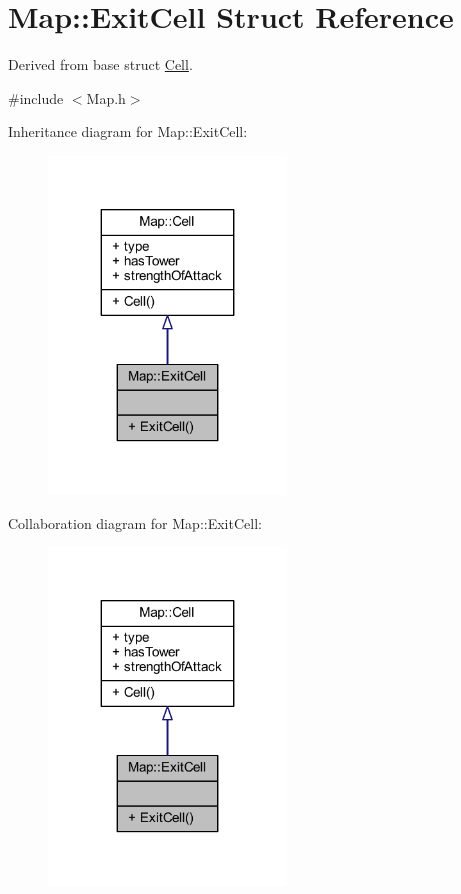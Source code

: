\hypertarget{struct_map_1_1_exit_cell}{\section{Map\+:\+:Exit\+Cell Struct Reference}
\label{struct_map_1_1_exit_cell}
}


Derived from base struct \hyperlink{struct_map_1_1_cell}{Cell}.  




{\ttfamily \#include $<$Map.\+h$>$}



Inheritance diagram for Map\+:\+:Exit\+Cell\+:
\nopagebreak
\begin{figure}[H]
\begin{center}
\leavevmode
\includegraphics[width=179pt]{struct_map_1_1_exit_cell__inherit__graph}
\end{center}
\end{figure}


Collaboration diagram for Map\+:\+:Exit\+Cell\+:
\nopagebreak
\begin{figure}[H]
\begin{center}
\leavevmode
\includegraphics[width=179pt]{struct_map_1_1_exit_cell__coll__graph}
\end{center}
\end{figure}
